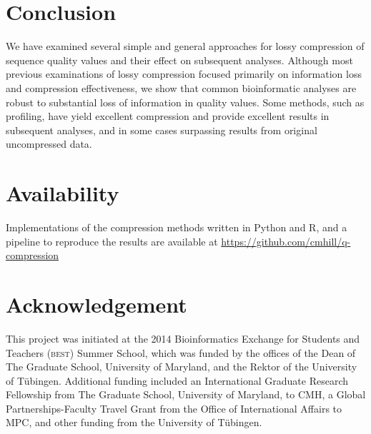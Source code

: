 \documentclass{bioinfo}
\begin{document}
%
%

\section{Conclusion}

We have examined several simple and general approaches for lossy
compression of sequence quality values and their effect on subsequent
analyses. Although most previous examinations of lossy compression
focused primarily on information loss and compression effectiveness,
we show that common bioinformatic analyses are robust to substantial
loss of information in quality values. Some methods, such as
profiling, have yield excellent compression and provide excellent
results in subsequent analyses, and in some cases surpassing results
from original uncompressed data.

\section{Availability}
Implementations of the compression methods written in Python and R,
and a pipeline to reproduce the results are available at
\url{https://github.com/cmhill/q-compression}

\section*{Acknowledgement}
This project was initiated at the 2014 Bioinformatics Exchange for
Students and Teachers (\textsc{best}) Summer School, which was funded
by the offices of the Dean of The Graduate School, University of
Maryland, and the Rektor of the University of T\"{u}bingen. Additional
funding included an International Graduate Research Fellowship from
The Graduate School, University of Maryland, to CMH, a Global
Partnerships-Faculty Travel Grant from the Office of International
Affairs to MPC, and other funding from the University of T\"{u}bingen.






%

%


\end{document}
